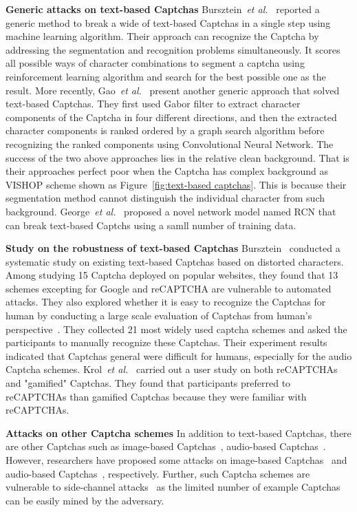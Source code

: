 \noindent \textbf{Generic attacks on text-based Captchas} Bursztein~\emph{et al.}~\cite{Bursztein2014The} reported a generic method to break a wide of text-based Captchas in a single step using machine learning algorithm. Their approach can recognize the Captcha by addressing the segmentation and recognition problems simultaneously. It scores all possible ways of character combinations to segment a captcha using reinforcement learning algorithm and search for the best possible one as the result.
More recently, Gao~\emph{et al.}~\cite{Gao2016A} present another generic approach that solved text-based Captchas. They first used Gabor filter to extract character components of the Captcha in four different directions, and then the extracted character components is ranked ordered by a graph search algorithm before recognizing the ranked components using Convolutional Neural Network.
The success of the two above approaches lies in the relative clean background. That is their approaches perfect poor when the Captcha has complex background as VISHOP scheme shown as Figure~\ref{fig:text-based captchas}. This is because their segmentation method cannot distinguish the individual character from such background.
George~\emph{et al.}~\cite{George2017A} proposed a novel network model named RCN that can break text-based Captchs using a samll number of training data.

\noindent \textbf{Study on the robustness of text-based Captchas} Bursztein~\cite{Bursztein2011Text} conducted a systematic study on existing text-based Captchas based on distorted characters. Among studying 15 Captcha deployed on popular websites, they found that 13 schemes excepting for Google and reCAPTCHA are vulnerable to automated attacks. They also explored whether it is easy to recognize the Captchas for human by conducting a large scale evaluation of Captchas from human's perspective~\cite{Bursztein2010How}. They collected 21 most widely used captcha schemes and asked the participants to manually recognize these Captchas. Their experiment results indicated that Captchas general were difficult for humans, especially for the audio Captcha schemes.
Krol~\emph{et al.}~\cite{Krol2016Better} carried out a user study on both reCAPTCHAs and "gamified" Captchas. They found that participants preferred to reCAPTCHAs than gamified Captchas because they were familiar with reCAPTCHAs.

\noindent \textbf{Attacks on other Captcha schemes} In addition to text-based Captchas, there are other Captchas such as image-based Captchas~\cite{Elson2007Asirra, Athanasopoulos2006Enhanced, Areyouhuman, Mohamed2017On, Gossweiler2009What}, audio-based Captchas~\cite{Schlaikjer2010A, Bigham2009Evaluating}.
However, researchers have proposed some attacks on image-based Captchas~\cite{Mohamed2014A, Gao2014An, Sivakorn2016I} and audio-based Captchas~\cite{Tam2008Breaking, Meutzner2014Reducing, Bursztein2009Decaptcha}, respectively. Further, such Captcha schemes are vulnerable to side-channel attacks~\cite{Hernandezcastro2009Side} as the limited number of example Captchas can be easily mined by the adversary.

